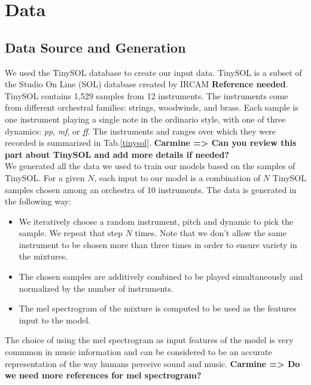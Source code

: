 \documentclass{article}
\newcommand{\carmine}[1]{\textbf{\color{red} Carmine => #1}}
\begin{document}
\section{Data}

\subsection{Data Source and Generation}

We used the TinySOL database to create our input data. TinySOL is a subset of the Studio On Line (SOL) database created by IRCAM \textbf{Reference needed}. TinySOL contains 1,529 samples from 12 instruments. The instruments come from different orchestral families: strings, woodwinds, and brass. Each sample is one instrument playing a single note in the ordinario style, with one of three dynamics: \textit{pp}, \textit{mf}, or \textit{ff}. The instruments and ranges over which they were recorded is summarized in Tab.\ref{tinysol}.  \carmine{Can you review this part about TinySOL and add more details if needed?}\\


We generated all the data we used to train our models based on the samples of TinySOL. For a given $N$, each input to our model is a combination of $N$ TinySOL samples chosen among an orchestra of 10 instruments. The data is generated in the following way: 

\begin{itemize}
\item We iteratively choose a random instrument, pitch and dynamic to pick the sample. We repeat that step $N$ times. Note that we don't allow the same instrument to be chosen more than three times in order to ensure variety in the mixtures.
\item The chosen samples are additively combined to be played simultaneously and normalized by the number of instruments.
\item The mel spectrogram of the mixture is computed to be used as the features input to the model.
\end{itemize}

The choice of using the mel spectrogram as input features of the model is very commmon in music information \cite{Stevens37} and can be considered to be an accurate representation of the way humans perceive sound and music.\carmine{Do we need more references for mel spectrogram?}\\
\end{document}
